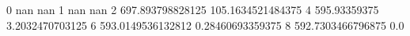 0 nan nan
1 nan nan
2 697.893798828125 105.1634521484375
4 595.93359375 3.2032470703125
6 593.0149536132812 0.28460693359375
8 592.7303466796875 0.0
